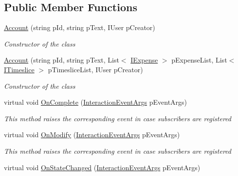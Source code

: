 \subsection*{Public Member Functions}
\begin{DoxyCompactItemize}
\item 
\hyperlink{class_plex_byte_1_1_mo_cap_1_1_interactions_1_1_account_a067473555d22524f93c988371c7ae0b8}{Account} (string p\+Id, string p\+Text, I\+User p\+Creator)
\begin{DoxyCompactList}\small\item\em Constructor of the class \end{DoxyCompactList}\item 
\hyperlink{class_plex_byte_1_1_mo_cap_1_1_interactions_1_1_account_a2143d30349b9dce3d6e154ac51a34829}{Account} (string p\+Id, string p\+Text, List$<$ \hyperlink{interface_plex_byte_1_1_mo_cap_1_1_interactions_1_1_i_expense}{I\+Expense} $>$ p\+Expense\+List, List$<$ \hyperlink{interface_plex_byte_1_1_mo_cap_1_1_interactions_1_1_i_timeslice}{I\+Timeslice} $>$ p\+Timeslice\+List, I\+User p\+Creator)
\begin{DoxyCompactList}\small\item\em Constructor of the class \end{DoxyCompactList}\item 
virtual void \hyperlink{class_plex_byte_1_1_mo_cap_1_1_interactions_1_1_account_a697e062e9b46c58922cbdce34b8e1574}{On\+Complete} (\hyperlink{class_plex_byte_1_1_mo_cap_1_1_interactions_1_1_interaction_event_args}{Interaction\+Event\+Args} p\+Event\+Args)
\begin{DoxyCompactList}\small\item\em This method raises the corresponding event in case subscribers are registered \end{DoxyCompactList}\item 
virtual void \hyperlink{class_plex_byte_1_1_mo_cap_1_1_interactions_1_1_account_a8b3878783c7aa0648adc8633e98e7f4e}{On\+Modify} (\hyperlink{class_plex_byte_1_1_mo_cap_1_1_interactions_1_1_interaction_event_args}{Interaction\+Event\+Args} p\+Event\+Args)
\begin{DoxyCompactList}\small\item\em This method raises the corresponding event in case subscribers are registered \end{DoxyCompactList}\item 
virtual void \hyperlink{class_plex_byte_1_1_mo_cap_1_1_interactions_1_1_account_aea5d67faea2dcce6ed0deff84274e9ad}{On\+State\+Changed} (\hyperlink{class_plex_byte_1_1_mo_cap_1_1_interactions_1_1_interaction_event_args}{Interaction\+Event\+Args} p\+Event\+Args)

\end{DoxyCompactItemize}
